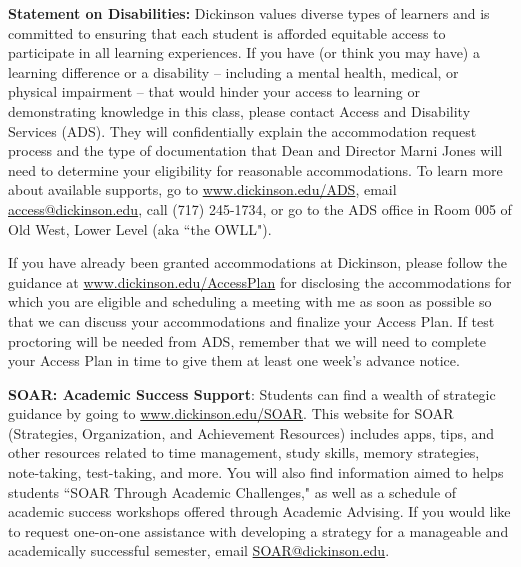\documentclass[11pt,letter]{article}
\begin{document}
\textbf{Statement on Disabilities:} Dickinson values diverse types of learners and is committed to ensuring that each student is afforded equitable access to participate in all learning experiences. If you have (or think you may have) a learning difference or a disability -- including a mental health, medical, or physical impairment – that would hinder your access to learning or demonstrating knowledge in this class, please contact Access and Disability Services (ADS). They will confidentially explain the accommodation request process and the type of documentation that Dean and Director Marni Jones will need to determine your eligibility for reasonable accommodations. To learn more about available supports, go to \href{www.dickinson.edu/ADS}{www.dickinson.edu/ADS}, email \href{access@dickinson.edu}{access@dickinson.edu}, call (717) 245-1734, or go to the ADS office in Room 005 of Old West, Lower Level (aka ``the OWLL").

If you have already been granted accommodations at Dickinson, please follow the guidance at \href{www.dickinson.edu/AccessPlan}{www.dickinson.edu/AccessPlan} for disclosing the accommodations for which you are eligible and scheduling a meeting with me as soon as possible so that we can discuss your accommodations and finalize your Access Plan. If test proctoring will be needed from ADS, remember that we will need to complete your Access Plan in time to give them at least one week’s advance notice.

\textbf{SOAR: Academic Success Support}: Students can find a wealth of strategic guidance by going to \href{www.dickinson.edu/SOAR}{www.dickinson.edu/SOAR}. This website for SOAR (Strategies, Organization, and Achievement Resources) includes apps, tips, and other resources related to time management, study skills, memory strategies, note-taking, test-taking, and more. You will also find information aimed to helps students ``SOAR Through Academic Challenges," as well as a schedule of academic success workshops offered through Academic Advising. If you would like to request one-on-one assistance with developing a strategy for a manageable and academically successful semester, email \href{SOAR@dickinson.edu}{SOAR@dickinson.edu}.
\end{document}
